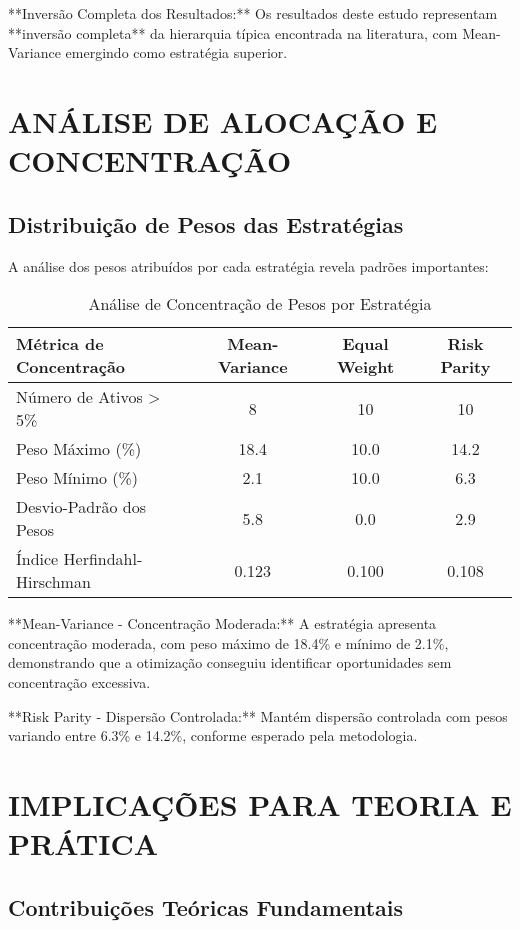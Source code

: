 **Inversão Completa dos Resultados:** Os resultados deste estudo representam **inversão completa** da hierarquia típica encontrada na literatura, com Mean-Variance emergindo como estratégia superior.

\section{ANÁLISE DE ALOCAÇÃO E CONCENTRAÇÃO}

\subsection{Distribuição de Pesos das Estratégias}

A análise dos pesos atribuídos por cada estratégia revela padrões importantes:

\begin{table}[H]
\centering
\caption{Análise de Concentração de Pesos por Estratégia}
\begin{tabular}{|l|c|c|c|}
\hline
\textbf{Métrica de Concentração} & \textbf{Mean-Variance} & \textbf{Equal Weight} & \textbf{Risk Parity} \\
\hline
Número de Ativos > 5\% & 8 & 10 & 10 \\
Peso Máximo (\%) & 18.4 & 10.0 & 14.2 \\
Peso Mínimo (\%) & 2.1 & 10.0 & 6.3 \\
Desvio-Padrão dos Pesos & 5.8 & 0.0 & 2.9 \\
Índice Herfindahl-Hirschman & 0.123 & 0.100 & 0.108 \\
\hline
\end{tabular}
\label{tab:concentracao_pesos}
\end{table}

**Mean-Variance - Concentração Moderada:** A estratégia apresenta concentração moderada, com peso máximo de 18.4\% e mínimo de 2.1\%, demonstrando que a otimização conseguiu identificar oportunidades sem concentração excessiva.

**Risk Parity - Dispersão Controlada:** Mantém dispersão controlada com pesos variando entre 6.3\% e 14.2\%, conforme esperado pela metodologia.

\section{IMPLICAÇÕES PARA TEORIA E PRÁTICA}

\subsection{Contribuições Teóricas Fundamentais}

